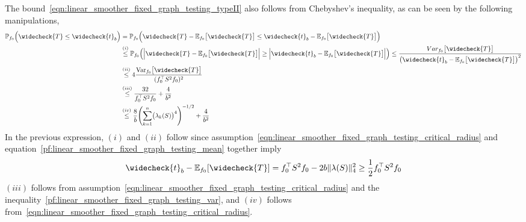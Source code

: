 \documentclass[twoside]{article}
\newcommand{\Var}{\mathrm{Var}}
\newcommand{\1}{\mathbf{1}}
\newcommand{\Pbb}{\mathbb{P}}
\newcommand{\Ebb}{\mathbb{E}}
\newcommand{\wc}[1]{\widecheck{#1}}
\theoremstyle{definition}
\theoremstyle{remark}
\begin{document}
The bound~\eqref{eqn:linear_smoother_fixed_graph_testing_typeII} also follows from Chebyshev's inequality, as can be seen by the following manipulations,
\begin{equation*}
\begin{aligned}
\Pbb_{f_0}\Bigl(\wc{T} \leq \wc{t}_b\Bigr) & = \Pbb_{f_0}\Bigl(\wc{T} - \Ebb_{f_0}\bigl[\wc{T}\bigr] \leq \wc{t}_b - \Ebb_{f_0}\bigl[\wc{T}\bigr]\Bigr) \\
& \overset{(i)}{\leq} \Pbb_{f_0}\Bigl(\Bigl|\wc{T} - \Ebb_{f_0}\bigl[\wc{T}\bigr]\Bigr| \geq \Bigl|\wc{t}_b - \Ebb_{f_0}\bigl[\wc{T}\bigr]\Bigr|\Bigr) \leq \frac{Var_{f_0}\bigl[\wc{T}\bigr]}{\bigl(\wc{t}_b - \Ebb_{f_0}\bigl[\wc{T}\bigr]\bigr)^2} \\ 
& \overset{(ii)}{\leq} 4 \frac{\Var_{f_0}\bigl[\wc{T}\bigr]}{(f_0^{\top} S^2 f_0)^2} \\
& \overset{(iii)}{\leq} \frac{32}{f_0^{\top} S^2 f_0} + \frac{4}{b^2} \\
& \overset{(iv)}{\leq} \frac{8}{b} \Biggl(\sum_{k = 1}^{n}\bigl(\lambda_k(S)\bigr)^4\Biggr)^{-1/2} + \frac{4}{b^2}
\end{aligned}
\end{equation*}
In the previous expression, $(i)$ and $(ii)$ follow since assumption~\eqref{eqn:linear_smoother_fixed_graph_testing_critical_radius} and equation~\eqref{pf:linear_smoother_fixed_graph_testing_mean} together imply 
\begin{equation*}
\wc{t}_b - \Ebb_{f_0}[\wc{T}] = f_0^{\top} S^2 f_0 - 2b\|{\bf \lambda}(S)\|_4^2 \geq \frac{1}{2}f_0^{\top} S^2 f_0
\end{equation*}
$(iii)$ follows from assumption~\eqref{eqn:linear_smoother_fixed_graph_testing_critical_radius} and the inequality~\eqref{pf:linear_smoother_fixed_graph_testing_var}, and $(iv)$ follows from~\eqref{eqn:linear_smoother_fixed_graph_testing_critical_radius}. 
\end{document}
